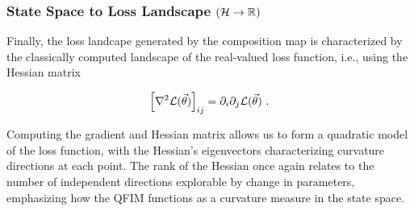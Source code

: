 \subsubsection{State Space to Loss Landscape \((\mathcal{H} \to \mathbb{R})\)}

Finally, the loss landcape generated by the composition map is characterized by
the classically computed landscape of the real-valued loss function, i.e., using
the Hessian matrix

\begin{equation}
    \left[\nabla^2 \mathcal{L}(\vec{\theta}) \right]_{ij} = \partial_i\partial_j \mathcal{L}(\vec{\theta})~.
\end{equation}

Computing the gradient and Hessian matrix allows us to form a quadratic model of
the loss function, with the Hessian's eigenvectors characterizing curvature
directions at each point. The rank of the Hessian once again relates to the
number of independent directions explorable by change in parameters, emphasizing
how the QFIM functions as a curvature measure in the state space.
